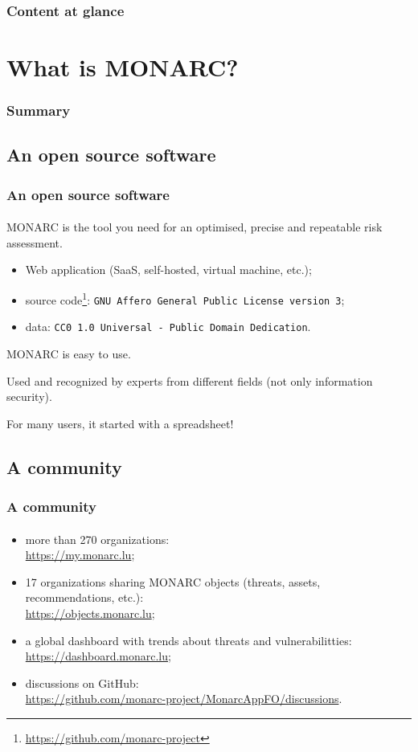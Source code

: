 \setcounter{tocdepth}{1}
\begin{frame}
  \frametitle{Content at glance}
  \tableofcontents
\end{frame}
\setcounter{tocdepth}{4}

%
%
\section{What is MONARC?}
\begin{frame}
  \frametitle{Summary}
\end{frame}
\subsection{An open source software}
\begin{frame}
  \frametitle{An open source software}
  \framesubtitle{}
  MONARC is the tool you need for an optimised, precise and repeatable risk assessment.

  \bigskip
  \begin{itemize}
    \item Web application (SaaS, self-hosted, virtual machine, etc.);
    \item source code\footnote{\url{https://github.com/monarc-project}}:
    \texttt{GNU Affero General Public License version 3};
    \item data: \texttt{CC0 1.0 Universal - Public Domain Dedication}.
  \end{itemize}

  \bigskip
  MONARC is easy to use.

  Used and recognized by experts from different fields (not only information security).

  \bigskip
  For many users, it started with a spreadsheet!
\end{frame}

\subsection{A community}
\begin{frame}
  \frametitle{A community}
  \framesubtitle{}
  \begin{itemize}
    \item more than 270 organizations:\\ \url{https://my.monarc.lu};
    \item 17 organizations sharing MONARC objects (threats, assets, recommendations, etc.):\\
    \url{https://objects.monarc.lu};
    \item a global dashboard with trends about threats and vulnerabilitties:\\
    \url{https://dashboard.monarc.lu};
    \item discussions on GitHub:\\
    \url{https://github.com/monarc-project/MonarcAppFO/discussions}.
  \end{itemize}
\end{frame}

